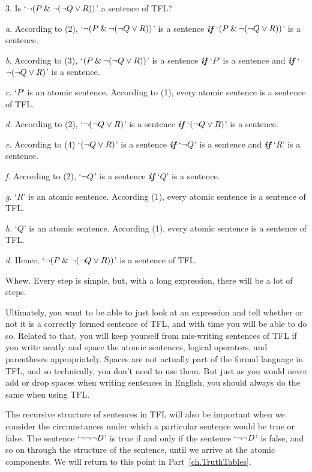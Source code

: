 \begin{ebullet}
	\item[3.] Is `${\neg}(P \mathbin{\&} {\neg} ({\neg} Q \vee R))$' a sentence of TFL?
		\begin{ebullet}
		\item[\textit{a}.] According to (2), `${\neg}(P \mathbin{\&} {\neg} ({\neg} Q \vee R))$' is a sentence \textit{\textbf{if}} `$(P \mathbin{\&} {\neg} ({\neg} Q \vee R))$' is a sentence.
		\item[\textit{b}.] According to (3), `$(P \mathbin{\&} {\neg} ({\neg} Q \vee R))$' is a sentence \textit{\textbf{if}} `$P$' is a sentence and \textit{\textbf{if}} `${\neg} ({\neg} Q \vee R)$' is a sentence.
		\item[\textit{c}.] `$P$' is an atomic sentence. According to (1), every atomic sentence is a sentence of TFL.
		\item[\textit{d}.] According to (2), `${\neg} ({\neg} Q \vee R)$' is a sentence \textit{\textbf{if}} `$({\neg} Q \vee R)$' is a sentence.
		\item[\textit{e}.] According to (4) `$({\neg} Q \vee R)$' is a sentence \textit{\textbf{if}} `${\neg} Q$' is a sentence and \textit{\textbf{if}} `$R$' is a sentence.
		\item[\textit{f}.] According to (2), `${\neg} Q$' is a sentence \textit{\textbf{if}} `$Q$' is a sentence.
		\item[\textit{g}.] `$R$' is an atomic sentence. According (1), every atomic sentence is a sentence of TFL.
		\item[\textit{h}.] `$Q$' is an atomic sentence. According (1), every atomic sentence is a sentence of TFL.
		\item[\textit{d}.] Hence, `${\neg}(P \mathbin{\&} {\neg} ({\neg} Q \vee R))$' is a sentence of TFL. 
		\end{ebullet}
	\end{ebullet}
Whew. Every step is simple, but, with a long expression, there will be a lot of steps. 

Ultimately, you want to be able to just look at an expression and tell whether or not it is a correctly formed sentence of TFL, and with time you will be able to do so. Related to that, you will keep yourself from mis-writing sentences of TFL if you write neatly and space the atomic sentences, logical operators, and parentheses appropriately. Spaces are not actually part of the formal language in TFL, and so technically, you don't need to use them. But just as you would never add or drop spaces when writing sentences in English, you should always do the same when using TFL.

The recursive structure of sentences in TFL will also be important when we consider the circumstances under which a particular sentence would be true or false. The sentence `${\neg} {\neg} {\neg} D$' is true if and only if the sentence `${\neg} {\neg} D$' is false, and so on through the structure of the sentence, until we arrive at the atomic components. We will return to this point in Part~\ref{ch.TruthTables}.


